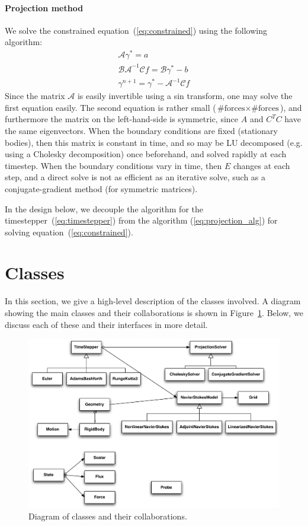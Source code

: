\documentclass[11pt]{article}
\begin{document}
\paragraph{Projection method}
We solve the constrained equation~(\ref{eq:constrained}) using the following algorithm:
\begin{equation}
\begin{aligned}
	\mathcal{A}\gamma^* = a\\
	\mathcal{BA}^{-1}\mathcal{C}f = \mathcal{B}\gamma^* - b\\
	\gamma^{n+1} = \gamma^* - \mathcal{A}^{-1}\mathcal{C}f
\end{aligned}
\label{eq:projection_alg}
\end{equation}
Since the matrix $\mathcal{A}$ is easily invertible using a sin transform, one may solve the first equation easily.  The second equation is rather small ($\text{\#forces} \times \text{\#forces}$), and furthermore the matrix on the left-hand-side is symmetric, since $A$ and $C^TC$ have the same eigenvectors.  When the boundary conditions are fixed (stationary bodies), then this matrix is constant in time, and so may be LU decomposed (e.g. using a Cholesky decomposition) once beforehand, and solved rapidly at each timestep.  When the boundary conditions vary in time, then $E$ changes at each step, and a direct solve is not as efficient as an iterative solve, such as a conjugate-gradient method (for symmetric matrices).

In the design below, we decouple the algorithm for the timestepper~(\ref{eq:timestepper}) from the algorithm (\ref{eq:projection_alg}) for solving equation~(\ref{eq:constrained}).

\section{Classes}
In this section, we give a high-level description of the classes involved.  A diagram showing the main classes and their collaborations is shown in Figure~\ref{fig:class_diagram}.  Below, we discuss each of these and their interfaces in more detail.

\begin{figure}
\centering
\includegraphics[width=0.95\linewidth]{IBFSDesign}
\caption{Diagram of classes and their collaborations.}
\label{fig:class_diagram}
\end{figure}
\end{document}
